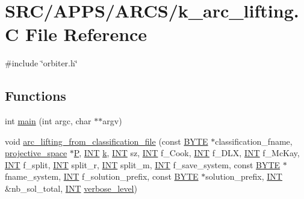 \hypertarget{k__arc__lifting_8_c}{}\section{S\+R\+C/\+A\+P\+P\+S/\+A\+R\+C\+S/k\+\_\+arc\+\_\+lifting.C File Reference}
\label{k__arc__lifting_8_c}
{\ttfamily \#include \char`\"{}orbiter.\+h\char`\"{}}\newline
\subsection*{Functions}
\begin{DoxyCompactItemize}
\item 
int \mbox{\hyperlink{k__arc__lifting_8_c_a3c04138a5bfe5d72780bb7e82a18e627}{main}} (int argc, char $\ast$$\ast$argv)
\item 
void \mbox{\hyperlink{k__arc__lifting_8_c_aede97f2af2307a758b06ad6506762b79}{arc\+\_\+lifting\+\_\+from\+\_\+classification\+\_\+file}} (const \mbox{\hyperlink{galois_8h_ab6cc7b4aeb6ea31aba2b3fbfc83ff5e6}{B\+Y\+TE}} $\ast$classification\+\_\+fname, \mbox{\hyperlink{classprojective__space}{projective\+\_\+space}} $\ast$\mbox{\hyperlink{simeon_8_c_a7fa15551e800919e93401fbbcd8e71e8}{P}}, \mbox{\hyperlink{galois_8h_a09fddde158a3a20bd2dcadb609de11dc}{I\+NT}} \mbox{\hyperlink{simeon_8_c_a43fa990200c3ddd47c35f151bd4d66bf}{k}}, \mbox{\hyperlink{galois_8h_a09fddde158a3a20bd2dcadb609de11dc}{I\+NT}} sz, \mbox{\hyperlink{galois_8h_a09fddde158a3a20bd2dcadb609de11dc}{I\+NT}} f\+\_\+\+Cook, \mbox{\hyperlink{galois_8h_a09fddde158a3a20bd2dcadb609de11dc}{I\+NT}} f\+\_\+\+D\+LX, \mbox{\hyperlink{galois_8h_a09fddde158a3a20bd2dcadb609de11dc}{I\+NT}} f\+\_\+\+Mc\+Kay, \mbox{\hyperlink{galois_8h_a09fddde158a3a20bd2dcadb609de11dc}{I\+NT}} f\+\_\+split, \mbox{\hyperlink{galois_8h_a09fddde158a3a20bd2dcadb609de11dc}{I\+NT}} split\+\_\+r, \mbox{\hyperlink{galois_8h_a09fddde158a3a20bd2dcadb609de11dc}{I\+NT}} split\+\_\+m, \mbox{\hyperlink{galois_8h_a09fddde158a3a20bd2dcadb609de11dc}{I\+NT}} f\+\_\+save\+\_\+system, const \mbox{\hyperlink{galois_8h_ab6cc7b4aeb6ea31aba2b3fbfc83ff5e6}{B\+Y\+TE}} $\ast$fname\+\_\+system, \mbox{\hyperlink{galois_8h_a09fddde158a3a20bd2dcadb609de11dc}{I\+NT}} f\+\_\+solution\+\_\+prefix, const \mbox{\hyperlink{galois_8h_ab6cc7b4aeb6ea31aba2b3fbfc83ff5e6}{B\+Y\+TE}} $\ast$solution\+\_\+prefix, \mbox{\hyperlink{galois_8h_a09fddde158a3a20bd2dcadb609de11dc}{I\+NT}} \&nb\+\_\+sol\+\_\+total, \mbox{\hyperlink{galois_8h_a09fddde158a3a20bd2dcadb609de11dc}{I\+NT}} \mbox{\hyperlink{simeon_8_c_a818073fbcc2f439e7c56952f67386122}{verbose\+\_\+level}})
$$
\end{DoxyCompactItemize}
